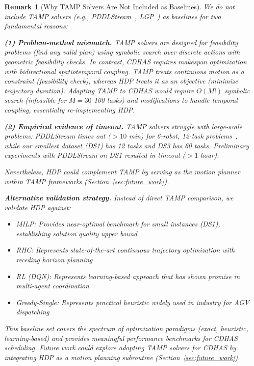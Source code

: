 \documentclass[manuscript,screen,review]{acmart}
\newtheorem{remark}{Remark}
\begin{document}
\begin{remark}[Why TAMP Solvers Are Not Included as Baselines]
\label{rem:tamp_baselines}
We do not include TAMP solvers (e.g., PDDLStream~\cite{bradley2022learning}, LGP~\cite{driess2021learning}) 
as baselines for two fundamental reasons:

\textbf{(1) Problem-method mismatch.} TAMP solvers are designed for 
\textit{feasibility problems} (find any valid plan) using symbolic search over 
discrete actions with geometric feasibility checks. In contrast, CDHAS requires 
\textit{makespan optimization} with bidirectional spatiotemporal coupling. TAMP treats continuous motion as a constraint (feasibility 
check), whereas HDP treats it as an objective (minimize trajectory duration). 
Adapting TAMP to CDHAS would require $O(M!)$ symbolic search (infeasible for 
$M = 30$-100 tasks) and modifications to handle temporal coupling, essentially 
re-implementing HDP.

\textbf{(2) Empirical evidence of timeout.} TAMP solvers struggle with large-scale 
problems: PDDLStream times out ($> 10$ min) for 6-robot, 12-task problems~\cite{zhao2024survey}, 
while our smallest dataset (DS1) has 12 tasks and DS3 has 60 tasks. Preliminary 
experiments with PDDLStream on DS1 resulted in timeout ($> 1$ hour).

Nevertheless, HDP could complement TAMP by serving as the motion planner within 
TAMP frameworks (Section~\ref{sec:future_work}).

\textbf{Alternative validation strategy.} Instead of direct TAMP comparison, 
we validate HDP against:
\begin{itemize}[leftmargin=*, itemsep=2pt]
    \item \textit{MILP}: Provides near-optimal benchmark for small instances 
    (DS1), establishing solution quality upper bound
    \item \textit{RHC}: Represents state-of-the-art continuous trajectory 
    optimization with receding horizon planning~\cite{yan2021rnn}
    \item \textit{RL (DQN)}: Represents learning-based approach that has shown 
    promise in multi-agent coordination~\cite{li2022improved}
    \item \textit{Greedy-Single}: Represents practical heuristic widely used 
    in industry for AGV dispatching
\end{itemize}
This baseline set covers the spectrum of optimization paradigms (exact, 
heuristic, learning-based) and provides meaningful performance benchmarks for 
CDHAS scheduling. Future work could explore adapting TAMP solvers for CDHAS 
by integrating HDP as a motion planning subroutine (Section~\ref{sec:future_work}).
\end{remark}
\end{document}
